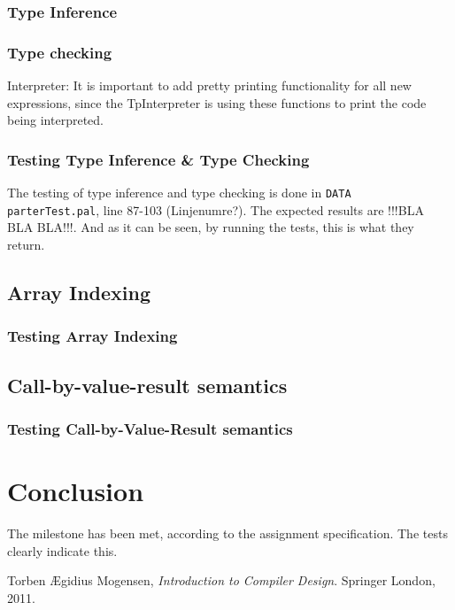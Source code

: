 \documentclass[10pt]{article}
\begin{document}
\subsubsection{Type Inference}
\subsubsection{Type checking}

Interpreter:
It is important to add pretty printing functionality for all new expressions, since the TpInterpreter is using these functions to print the code being interpreted.
\subsubsection{Testing Type Inference \& Type Checking}
The testing of type inference and type checking is done in \texttt{DATA\\parterTest.pal}, line 87-103 (Linjenumre?). The expected results are !!!BLA BLA BLA!!!. And as it can be seen, by running the tests, this is what they return.
\subsection{Array Indexing}
\subsubsection{Testing Array Indexing}
\subsection{Call-by-value-result semantics}
\subsubsection{Testing Call-by-Value-Result semantics}

\section{Conclusion}
The milestone has been met, according to the assignment specification. The tests clearly indicate this.

\begin{thebibliography}{9}
Torben Ægidius Mogensen,
\emph{Introduction to Compiler Design}.
Springer London,
2011.

\end{thebibliography}


\end{document}
